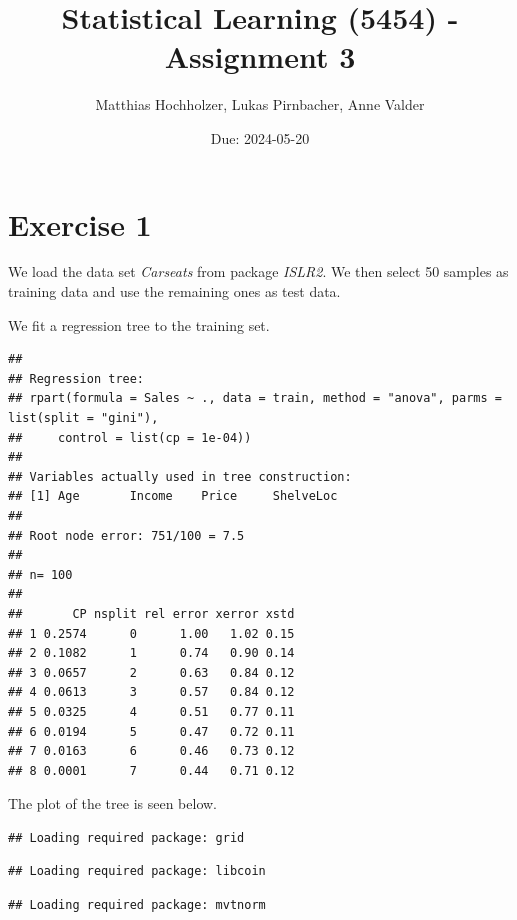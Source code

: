 \documentclass[
]{article}
\title{Statistical Learning (5454) - Assignment 3}
\author{Matthias Hochholzer, Lukas Pirnbacher, Anne Valder}
\date{Due: 2024-05-20}
\begin{document}
\maketitle

\section{Exercise 1}\label{exercise-1}

We load the data set \textit{Carseats} from package \textit{ISLR2}. We
then select 50 samples as training data and use the remaining ones as
test data.

We fit a regression tree to the training set.

\begin{verbatim}
## 
## Regression tree:
## rpart(formula = Sales ~ ., data = train, method = "anova", parms = list(split = "gini"), 
##     control = list(cp = 1e-04))
## 
## Variables actually used in tree construction:
## [1] Age       Income    Price     ShelveLoc
## 
## Root node error: 751/100 = 7.5
## 
## n= 100 
## 
##       CP nsplit rel error xerror xstd
## 1 0.2574      0      1.00   1.02 0.15
## 2 0.1082      1      0.74   0.90 0.14
## 3 0.0657      2      0.63   0.84 0.12
## 4 0.0613      3      0.57   0.84 0.12
## 5 0.0325      4      0.51   0.77 0.11
## 6 0.0194      5      0.47   0.72 0.11
## 7 0.0163      6      0.46   0.73 0.12
## 8 0.0001      7      0.44   0.71 0.12
\end{verbatim}

The plot of the tree is seen below.

\begin{verbatim}
## Loading required package: grid
\end{verbatim}

\begin{verbatim}
## Loading required package: libcoin
\end{verbatim}

\begin{verbatim}
## Loading required package: mvtnorm
\end{verbatim}
\end{document}
